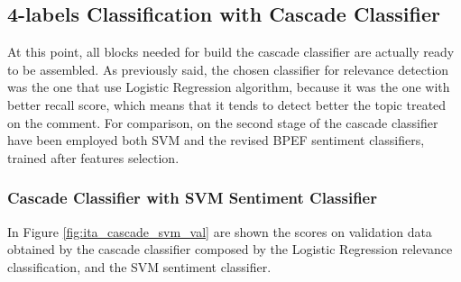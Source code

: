\subsection{4-labels Classification with Cascade Classifier}

At this point, all blocks needed for build the cascade classifier are actually ready to be assembled. As previously said, the chosen classifier for relevance detection was the one that use Logistic Regression algorithm, because it was the one with better recall score, which means that it tends to detect better the topic treated on the comment. For comparison, on the second stage of the cascade classifier have been employed both SVM and the revised BPEF sentiment classifiers, trained after features selection.

\subsubsection{Cascade Classifier with SVM Sentiment Classifier}

In Figure \ref{fig:ita_cascade_svm_val} are shown the scores on validation data obtained by the cascade classifier composed by the Logistic Regression relevance classification, and the SVM sentiment classifier.

